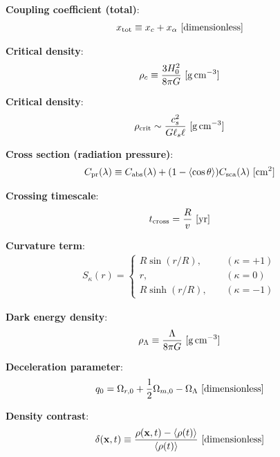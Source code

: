 \documentclass[a4paper,10pt]{article}
\begin{document}
{\noindent}\textbf{Coupling coefficient (total)}:
\begin{align*}
    x_\mathrm{tot} \equiv x_c + x_\alpha ~ [{\rm dimensionless}]
\end{align*}

{\noindent}\textbf{Critical density}:
\begin{align*}
    \rho_c \equiv \dfrac{3H_0^2}{8\pi G}  ~ [{\rm g\,cm^{-3}}]
\end{align*}

{\noindent}\textbf{Critical density}:
\begin{align*}
    \rho_\mathrm{crit} \sim \frac{c_s^2}{G\ell_s\ell} ~ [{\rm g\,cm^{-3}}]
\end{align*}

{\noindent}\textbf{Cross section (radiation pressure)}:
\begin{align*}
   C_{\rm pr}(\lambda) \equiv C_{\rm abs}(\lambda) + (1-\langle\cos\theta\rangle)C_{\rm sca}(\lambda) ~ [{\rm cm^2}]
\end{align*}

{\noindent}\textbf{Crossing timescale}:
\begin{align*}
    t_\mathrm{cross} = \frac{R}{v} ~ [{\rm yr}]
\end{align*}

{\noindent}\textbf{Curvature term}:
\begin{align*}
S_\kappa(r) =
\left\{
\begin{aligned}
R\sin(r/R), ~~~~~& (\kappa = +1) \\
          r,~~~~~& (\kappa = 0) \\
R\sinh(r/R),~~~~~& (\kappa = -1)
\end{aligned}
\right.
\end{align*}

{\noindent}\textbf{Dark energy density}:
\begin{align*}
    \rho_\Lambda \equiv \dfrac{\Lambda}{8\pi G} ~ [{\rm g\,cm^{-3}}]
\end{align*}

{\noindent}\textbf{Deceleration parameter}:
\begin{align*}
    q_0 = \Omega_{r,0} + \frac{1}{2}\Omega_{m,0} - \Omega_\Lambda ~ [{\rm dimensionless}]
\end{align*}

{\noindent}\textbf{Density contrast}:
\begin{align*}
    \delta(\mathbf{x},t) \equiv \frac{\rho(\mathbf{x},t)-\langle\rho(t)\rangle}{\langle\rho(t)\rangle} ~ [{\rm dimensionless}]
\end{align*}
\end{document}
